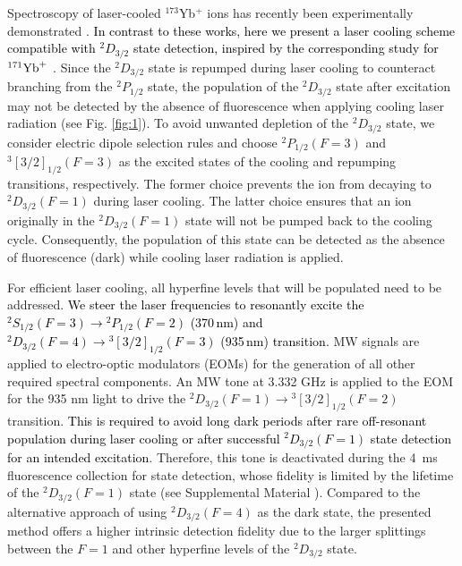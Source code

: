 \documentclass[
reprint,
superscriptaddress,









amsmath,amssymb,
aps,prl






]{revtex4-2}
\newcommand{\m}[1]{\textcolor{black}{#1}}
\begin{document}
Spectroscopy of laser-cooled $^{173}$Yb$^+$ ions has recently been experimentally demonstrated \cite{Roman2021,Dellaert2025}. \m{In contrast to these works, here we present a laser cooling scheme compatible with $^2\!D_{3/2}$ state detection, inspired by the corresponding study for $^{171}\rm{Yb}^+$ \cite{Tamm2000}.} Since the ${}^2\!D_{3/2}$ state is repumped during laser cooling to counteract branching from the ${}^2\!P_{1/2}$ state, the population of the ${}^2\!D_{3/2}$ state after excitation may not be detected by the absence of fluorescence when applying cooling laser radiation (see Fig. \ref{fig:1}).
To avoid unwanted depletion of the $^2\!D_{3/2}$ state, we consider electric dipole selection rules and choose ${}^2\!P_{1/2}(F=3)$ and ${}^3[3/2]_{1/2}(F=3)$ as the excited states of the cooling and repumping transitions, respectively. The former choice prevents the ion from decaying to ${}^2\!D_{3/2}(F=1)$ during laser cooling. The latter choice ensures that an ion originally in the ${}^2\!D_{3/2}(F=1)$ state will not be pumped back to the cooling cycle. Consequently, the population of this state can be detected as the absence of fluorescence (dark) while cooling laser radiation is applied.

For efficient laser cooling, all hyperfine levels that will be populated need to be addressed. \m{We steer the laser frequencies to resonantly excite the $^2\!S_{1/2}(F=3) \rightarrow {^2\!P_{1/2}}(F=2)$ (370\,nm) and $^2\!D_{3/2}(F=4) \rightarrow {^3[3/2]_{1/2}}(F=3)$ (935\,nm) transition.} MW signals are applied to electro-optic modulators (EOMs) for the generation of all other required spectral components.
An MW tone at 3.332 GHz is applied to the EOM for the 935 nm light to drive the $^2\!D_{3/2}(F=1) \rightarrow {}^3[3/2]_{1/2}(F=2)$ transition. \m{This is required to avoid long dark periods after rare off-resonant population during laser cooling or after successful $^2\!D_{3/2}(F=1)$ state detection for an intended excitation}.
Therefore, this tone is deactivated during the 4~ms fluorescence collection for state detection, whose fidelity is limited by the lifetime of the
${}^2\!D_{3/2}(F=1)$ state (see Supplemental Material \cite{appendixA}\nocite{abdelhafiz2019}\nocite{Leibfried2003}\nocite{KozPorFla96}\nocite{KozPorSaf15}\nocite{RalKraRea11}\nocite{RobTayGat99}). Compared to the alternative approach of using ${}^2\!D_{3/2}(F=4)$ as the dark state, the presented method offers a higher intrinsic detection fidelity due to the larger splittings between the $F=1$ and other hyperfine levels of the ${}^2\!D_{3/2}$ state.
\end{document}
